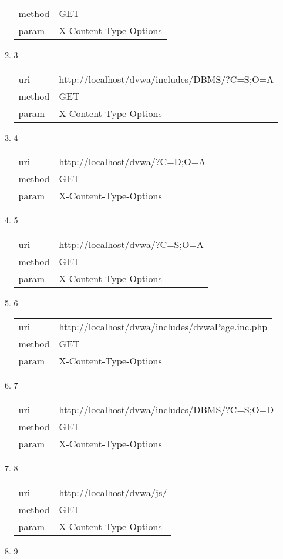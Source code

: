 \documentclass[10pt]{article}
\begin{document}
\begin{itemize}
\begin{enumerate}
\begin{tabular}{| l | p{12cm}}
method & GET \\
param & X-Content-Type-Options \\
\end{tabular}
\item[] 3
\begin{tabular}{| l | p{12cm}}
uri & http://localhost/dvwa/includes/DBMS/?C=S;O=A \\
method & GET \\
param & X-Content-Type-Options \\
\end{tabular}
\item[] 4
\begin{tabular}{| l | p{12cm}}
uri & http://localhost/dvwa/?C=D;O=A \\
method & GET \\
param & X-Content-Type-Options \\
\end{tabular}
\item[] 5
\begin{tabular}{| l | p{12cm}}
uri & http://localhost/dvwa/?C=S;O=A \\
method & GET \\
param & X-Content-Type-Options \\
\end{tabular}
\item[] 6
\begin{tabular}{| l | p{12cm}}
uri & http://localhost/dvwa/includes/dvwaPage.inc.php \\
method & GET \\
param & X-Content-Type-Options \\
\end{tabular}
\item[] 7
\begin{tabular}{| l | p{12cm}}
uri & http://localhost/dvwa/includes/DBMS/?C=S;O=D \\
method & GET \\
param & X-Content-Type-Options \\
\end{tabular}
\item[] 8
\begin{tabular}{| l | p{12cm}}
uri & http://localhost/dvwa/js/ \\
method & GET \\
param & X-Content-Type-Options \\
\end{tabular}
\item[] 9
\begin{tabular}{| l | p{12cm}}

\end{tabular}
\end{enumerate}
\end{itemize}
\end{document}
